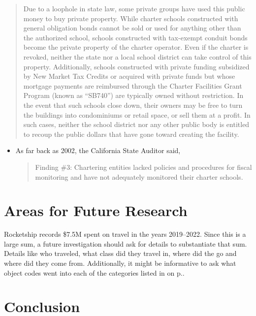 \begin{quotation}
  Due to a loophole in state law, some private groups have used this public money to buy private property. While charter schools constructed with general obligation bonds cannot be sold or used for anything other than the authorized school, schools constructed with tax-exempt conduit bonds become the private property of the charter operator. Even if the charter is revoked, neither the state nor a local school district can take control of this property. Additionally, schools constructed with private funding subsidized by New Market Tax Credits or acquired with private funds but whose mortgage payments are reimbursed through the Charter Facilities Grant Program (known as “SB740”) are typically owned without restriction. In the event that such schools close down, their owners may be free to turn the buildings into condominiums or retail space, or sell them at a profit. In such cases, neither the school district nor any other public body is entitled to recoup the public dollars that have gone toward creating the facility. 
\end{quotation}
\begin{itemize}[topsep=0.125\baselineskip,itemsep=0.25\baselineskip]
  \item As far back as 2002, the California State Auditor said, 
  \begin{quote}
    Finding \#3: Chartering entities lacked policies and procedures for fiscal monitoring and have not adequately monitored their charter schools. 
  \end{quote}
\end{itemize}

\section{Areas for Future Research}%
\label{sec:areas-future-rese}\indent%

Rocketship records \$7.5M spent on travel in the years 2019–2022. Since this is a large sum, a future investigation should ask for details to substantiate that sum. Details like who traveled, what class did they travel in, where did the go and where did they come from. Additionally, it might be informative to ask what object codes went into each of the categories listed in  on p.\pageref{tab:consolidated_functional_expenses}.



\section{Conclusion}%
\label{sec:conclusion}\indent%


